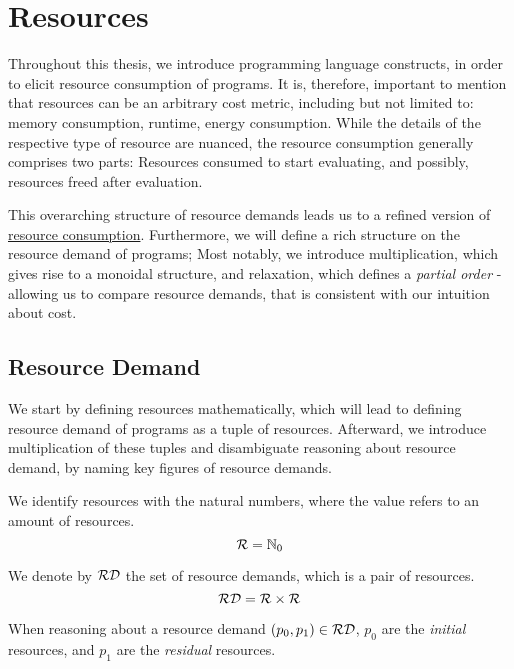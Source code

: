 \chapter{Resources}

Throughout this thesis, we introduce programming language constructs, in order to elicit resource consumption of programs. It is, therefore, important to mention that resources can be an arbitrary cost metric, including but not limited to: memory consumption, runtime, energy consumption. While the details of the respective type of resource are nuanced, the resource consumption generally comprises two parts: Resources consumed to start evaluating, and possibly, resources freed after evaluation.

This overarching structure of resource demands leads us to a refined version of \href{def:resource-consumption}{resource consumption}. Furthermore, we will define a rich structure on the resource demand of programs; Most notably, we introduce multiplication, which gives rise to a monoidal structure, and relaxation, which defines a \emph{partial order} - allowing us to compare resource demands, that is consistent with our intuition about cost.

\section{Resource Demand}

We start by defining resources mathematically, which will lead to defining resource demand of programs as a tuple of resources. Afterward, we introduce multiplication of these tuples and disambiguate reasoning about resource demand, by naming key figures of resource demands.

\begin{definition}[Resources]
   We identify resources with the natural numbers, where the value refers to an amount of resources.
   \[
      \mathcal{R} = \mathbb{N}_0
   \]
\end{definition}


\begin{definition}\label{def:resource-pair}
   We denote by \(\mathcal{RD}\) the set of resource demands, which is a pair of resources.
   \[
      \mathcal{RD} = \mathcal{R} \times \mathcal{R}
   \]
\end{definition}

When reasoning about a resource demand \((p_0, p_1) \in \mathcal{RD}\), \(p_0\) are the \emph{initial} resources, and \(p_1\) are the \emph{residual} resources. 

